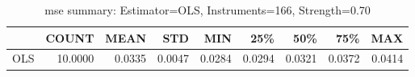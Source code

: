 \begin{table}[ht]
\centering
\caption{mse summary: Estimator=OLS, Instruments=166, Strength=0.70}
\begin{tabular}{lrrrrrrrr}
\toprule
 & COUNT & MEAN & STD & MIN & 25\% & 50\% & 75\% & MAX \\
\midrule
OLS & 10.0000 & 0.0335 & 0.0047 & 0.0284 & 0.0294 & 0.0321 & 0.0372 & 0.0414 \\
\bottomrule
\end{tabular}
\end{table}
